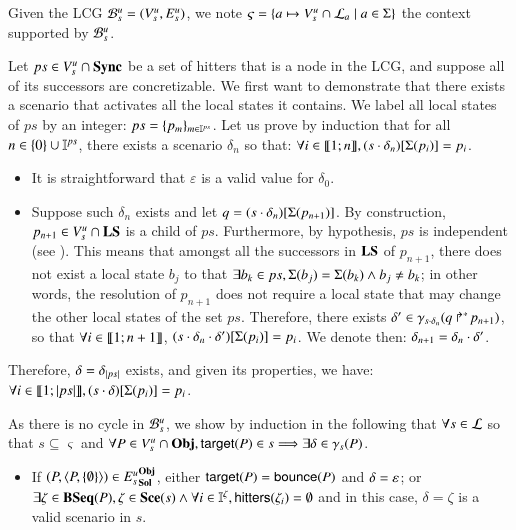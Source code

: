 \begin{proofapproxinf}
Given the LCG ${\mathcal{B}_{s}^{u}}=(V_s^u,E_s^u)$,
we note $\varsigma = \{a\mapsto V_s^u\cap\mathcal{L}_a \mid a\in\Sigma\}$ the context supported by ${\mathcal{B}_{s}^{u}}$.

Let $ps \in {V_s^u} \cap \mathbf{Sync}$ be a set of hitters
that is a node in the LCG,
and suppose all of its successors are concretizable.
We first want to demonstrate that
there exists a scenario that activates all the local states it contains.
We label all local states of $ps$ by an integer: $ps = \{ p_m \}_{m \in \mathbb{I}^{ps}}$.
Let us prove by induction that for all $n \in \{ 0 \} \cup \mathbb{I}^{ps}$,
there exists a scenario $\delta_n$ so that:
$\forall i \in \llbracket 1; n \rrbracket, {(s \cdot \delta_n)[\Sigma(p_i)]} = p_i$.
\begin{itemize}
  \item It is straightforward that $\varepsilon$ is a valid value for $\delta_0$.
  \item Suppose such $\delta_n$ exists and let $q = {(s \cdot \delta_n)[\Sigma(p_{n+1})]}$.
    By construction, $p_{n+1} \in {V_s^u} \cap \mathbf{LS}$ is a child of $ps$.
    Furthermore, by hypothesis, $ps$ is independent (see ).
    This means that amongst all the successors in $\mathbf{LS}$ of $p_{n+1}$,
    there does not exist a local state $b_j$ to that
    $\exists b_k \in ps, \Sigma(b_j) = \Sigma(b_k) \wedge b_j \neq b_k$;
    in other words, the resolution of $p_{n+1}$ does not require a local state
    that may change the other local states of the set $ps$.
    Therefore, there exists $\delta' \in \gamma_{s \cdot \delta_n}(\mbox{$q\Rsh^*\!p_{n+1}$})$,
    so that $\forall i \in \llbracket 1; n+1 \rrbracket$, ${(s \cdot \delta_n \cdot \delta')[\Sigma(p_{i})]} = p_{i}$.
    We denote then: $\delta_{n+1} = \delta_n \cdot \delta'$.
\end{itemize}
Therefore, $\delta = \delta_{|ps|}$ exists, and given its properties, we have:
$\forall i \in \llbracket 1; |ps| \rrbracket, {(s \cdot \delta)[\Sigma(p_{i})]} = p_{i}$.

As there is no cycle in ${\mathcal{B}_{s}^{u}}$, we show by induction in the following that
$\forall s\in \mathcal{L}$ so that $s\subseteq \varsigma$ and $\forall P \in {V_s^u} \cap \mathbf{Obj},
\mathsf{target}(P) \in s \Longrightarrow \exists \delta \in \gamma_s(P)$.
\begin{itemize}
  \item If $(P, \langle P, \{ \emptyset \} \rangle) \in {E_s^u}^{\mathbf{Obj}}_{\mathbf{Sol}}$,
    either $\mathsf{target}(P) = \mathsf{bounce}(P)$ and $\delta = \varepsilon$;
    or $\exists \zeta \in \mathbf{BSeq}(P), \zeta \in \mathbf{Sce}(s) \wedge
      \forall i \in \mathbb{I}^{\zeta}, \mathsf{hitters}(\zeta_i) = \emptyset$
    and in this case, $\delta = \zeta$ is a valid scenario in $s$.


\end{itemize}
\end{proofapproxinf}
